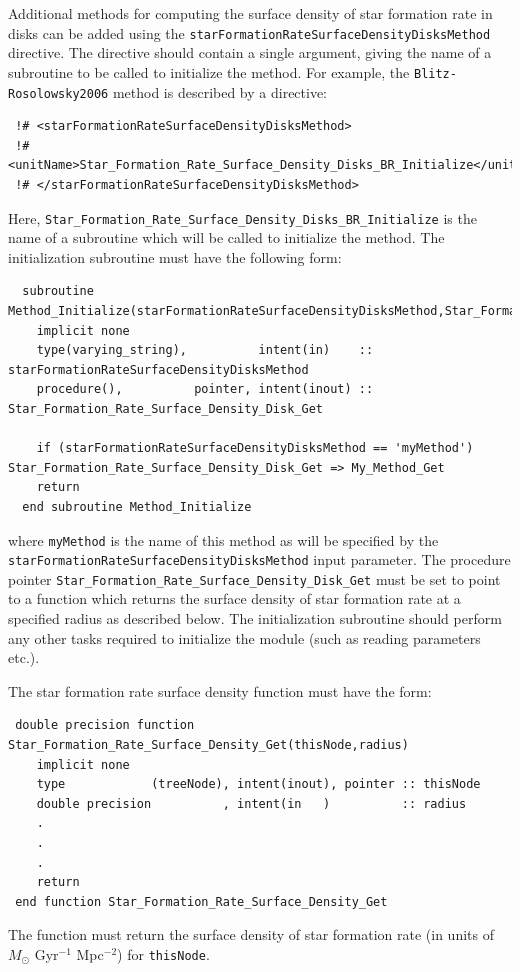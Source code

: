 Additional methods for computing the surface density of star formation rate in disks can be added using the {\tt starFormationRateSurfaceDensityDisksMethod} directive. The directive should contain a single argument, giving the name of a subroutine to be called to initialize the method. For example, the {\tt Blitz-Rosolowsky2006} method is described by a directive:
\begin{verbatim}
 !# <starFormationRateSurfaceDensityDisksMethod>
 !#  <unitName>Star_Formation_Rate_Surface_Density_Disks_BR_Initialize</unitName>
 !# </starFormationRateSurfaceDensityDisksMethod>
\end{verbatim}
Here, {\tt Star\_Formation\_Rate\_Surface\_Density\_Disks\_BR\_Initialize} is the name of a subroutine which will be called to initialize the method. The initialization subroutine must have the following form:
\begin{verbatim}
  subroutine Method_Initialize(starFormationRateSurfaceDensityDisksMethod,Star_Formation_Rate_Surface_Density_Disk_Get)
    implicit none
    type(varying_string),          intent(in)    :: starFormationRateSurfaceDensityDisksMethod
    procedure(),          pointer, intent(inout) :: Star_Formation_Rate_Surface_Density_Disk_Get
    
    if (starFormationRateSurfaceDensityDisksMethod == 'myMethod') Star_Formation_Rate_Surface_Density_Disk_Get => My_Method_Get
    return
  end subroutine Method_Initialize
\end{verbatim}
where {\tt myMethod} is the name of this method as will be specified by the {\tt starFormationRateSurfaceDensityDisksMethod} input parameter. The procedure pointer {\tt Star\_Formation\_Rate\_Surface\_Density\_Disk\_Get} must be set to point to a function which returns the surface density of star formation rate at a specified radius as described below. The initialization subroutine should perform any other tasks required to initialize the module (such as reading parameters etc.).

The star formation rate surface density function must have the form:
\begin{verbatim}
 double precision function Star_Formation_Rate_Surface_Density_Get(thisNode,radius)
    implicit none
    type            (treeNode), intent(inout), pointer :: thisNode
    double precision          , intent(in   )          :: radius
    .
    .
    .
    return
 end function Star_Formation_Rate_Surface_Density_Get
\end{verbatim}
The function must return the surface density of star formation rate (in units of $M_\odot$ Gyr$^{-1}$ Mpc$^{-2}$) for {\tt thisNode}.

